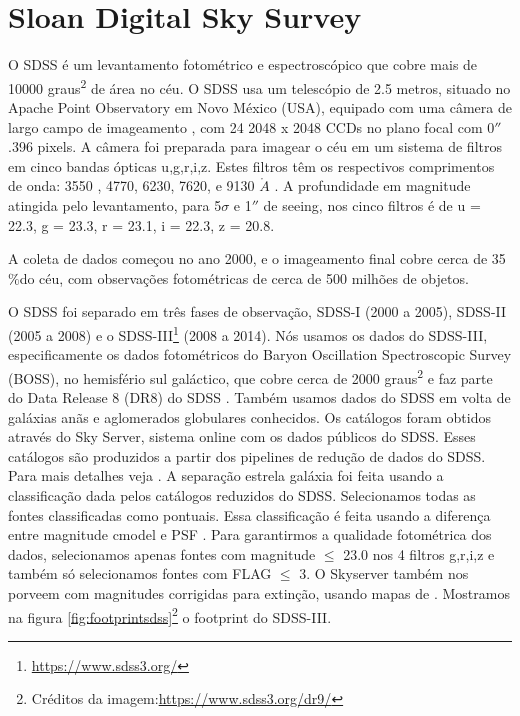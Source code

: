 \documentclass[
	12pt,				%
	openany,			%
	oneside,			%
	a4paper,			%
	english,			%
	brazil				%
	]{abntex2}
\begin{document}
\section{Sloan Digital Sky Survey}
O SDSS \cite{2000AJ....120.1579Y} é um levantamento fotométrico e espectroscópico que cobre mais de 10000 graus\textsuperscript{2} de área no céu. O SDSS usa um telescópio de 2.5 metros, situado no Apache Point Observatory em Novo México (USA), equipado com  uma câmera de largo campo de imageamento \cite{1998AJ....116.3040G}, com  24 2048 x 2048 CCDs no plano focal com 0$''$.396 pixels. A câmera  foi preparada para imagear o céu em um sistema de filtros em cinco bandas ópticas u,g,r,i,z. Estes filtros têm os respectivos comprimentos de onda:  3550 , 4770, 6230, 7620, e 9130 $\mathring{A}$ \cite{1996AJ....111.1748F}. A profundidade em magnitude atingida pelo levantamento, para  5$\sigma$ e 1$''$ de seeing,  nos cinco filtros é de u = 22.3, g = 23.3, r = 23.1, i = 22.3, z = 20.8. \par
A coleta de dados começou no ano 2000, e o imageamento final cobre cerca de 35$\% $do céu, com observações fotométricas de cerca de 500 milhões de objetos. \par
O SDSS foi separado em três fases de observação, SDSS-I (2000 a 2005), SDSS-II (2005 a 2008) e o SDSS-III\footnote{\url{https://www.sdss3.org/}} (2008 a 2014). Nós usamos os dados do SDSS-III, especificamente os dados fotométricos do Baryon Oscillation Spectroscopic Survey (BOSS), no hemisfério sul galáctico, que cobre cerca de 2000 graus\textsuperscript{2}  e faz parte do Data Release 8 (DR8) do SDSS \cite{2011ApJS..193...29A}. Também usamos dados  do SDSS em volta de galáxias anãs  e aglomerados globulares conhecidos. Os catálogos foram obtidos através  do Sky Server, sistema online com os dados públicos do SDSS. Esses catálogos são produzidos  a partir dos pipelines de redução de dados do SDSS. Para mais detalhes veja \cite{2001ASPC..238..269L,2000AJ....120.1579Y,2002AJ....123..485S}.  A separação estrela galáxia foi feita usando a classificação dada pelos catálogos reduzidos do SDSS. Selecionamos todas as fontes classificadas como pontuais. Essa classificação é feita usando a diferença entre magnitude cmodel e PSF \cite{2002AJ....123..485S}. Para garantirmos a qualidade fotométrica dos dados, selecionamos apenas fontes com magnitude $\le$ 23.0 nos 4 filtros g,r,i,z e também só selecionamos fontes com FLAG $\le$ 3. O Skyserver também nos porveem com magnitudes corrigidas para extinção, usando mapas de \cite{1998ApJ...500..525S}. Mostramos na figura \ref{fig:footprintsdss}\footnote{Créditos da imagem:\url{https://www.sdss3.org/dr9/}} o footprint do SDSS-III.
\end{document}
